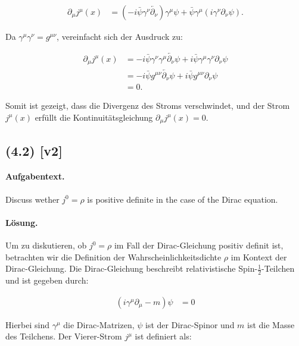 \documentclass[11pt,a4paper]{article}
\begin{document}
\begin{align*}
\partial_\mu j^\mu(x) &= (-i \bar{\psi} \gamma^\nu \overleftarrow{\partial_\nu}) \gamma^\mu \psi + \bar{\psi} \gamma^\mu (i \gamma^\nu \partial_\nu \psi).
\end{align*}

Da $\gamma^\mu \gamma^\nu = g^{\mu\nu}$, vereinfacht sich der Ausdruck zu:

\begin{align*}
\partial_\mu j^\mu(x) &= -i \bar{\psi} \gamma^\nu \gamma^\mu \overleftarrow{\partial_\nu} \psi + i \bar{\psi} \gamma^\mu \gamma^\nu \partial_\nu \psi \\
&= -i \bar{\psi} g^{\mu\nu} \overleftarrow{\partial_\nu} \psi + i \bar{\psi} g^{\mu\nu} \partial_\nu \psi \\
&= 0.
\end{align*}

Somit ist gezeigt, dass die Divergenz des Stroms verschwindet, und der Strom $j^\mu(x)$ erfüllt die Kontinuitätsgleichung $\partial_\mu j^\mu(x) = 0$.


\subsection*{(4.2) [v2]}
\paragraph{Aufgabentext.}
Discuss wether $j^0=\rho$ is positive definite in the case of the Dirac equation.

\paragraph{Lösung.}
Um zu diskutieren, ob $j^0 = \rho$ im Fall der Dirac-Gleichung positiv definit ist, betrachten wir die Definition der Wahrscheinlichkeitsdichte $\rho$ im Kontext der Dirac-Gleichung. Die Dirac-Gleichung beschreibt relativistische Spin-$\frac{1}{2}$-Teilchen und ist gegeben durch:

\begin{align*}
(i\gamma^\mu \partial_\mu - m)\psi &= 0
\end{align*}

Hierbei sind $\gamma^\mu$ die Dirac-Matrizen, $\psi$ ist der Dirac-Spinor und $m$ ist die Masse des Teilchens. Der Vierer-Strom $j^\mu$ ist definiert als:
\end{document}
